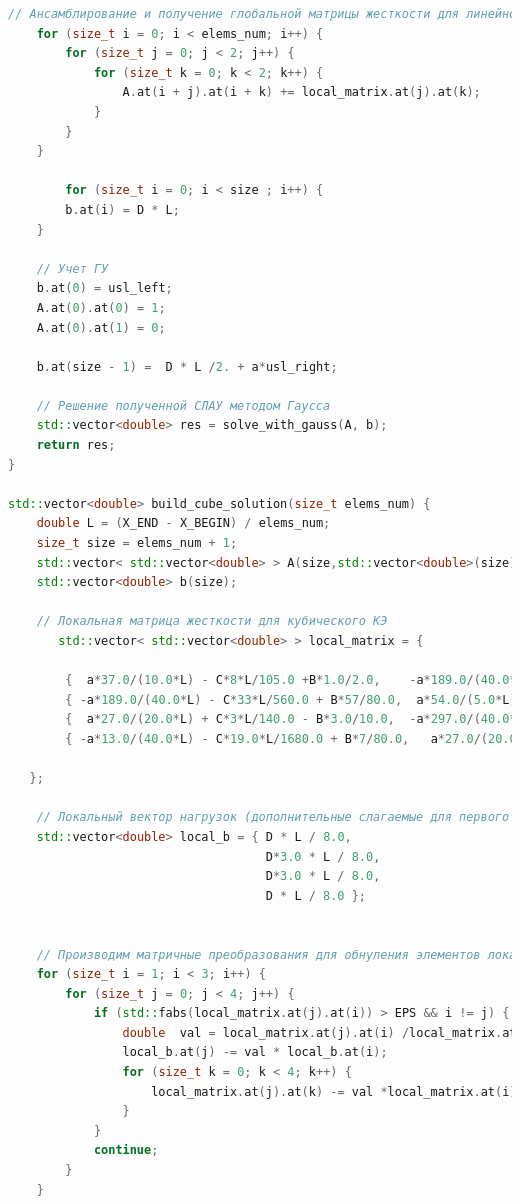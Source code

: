 \begin{lstlisting}[language=c++, label=prog,caption={\textit{Реализация МКЭ}}]
    // Ансамблирование и получение глобальной матрицы жесткости для линейного КЭ
    for (size_t i = 0; i < elems_num; i++) {
        for (size_t j = 0; j < 2; j++) {
            for (size_t k = 0; k < 2; k++) {
                A.at(i + j).at(i + k) += local_matrix.at(j).at(k);
            }
        }
    }
    
        for (size_t i = 0; i < size ; i++) {
        b.at(i) = D * L;
    }
    
    // Учет ГУ 
    b.at(0) = usl_left;
    A.at(0).at(0) = 1;
    A.at(0).at(1) = 0;
    
    b.at(size - 1) =  D * L /2. + a*usl_right;
    
    // Решение полученной СЛАУ методом Гаусса
    std::vector<double> res = solve_with_gauss(A, b);
    return res;
}

std::vector<double> build_cube_solution(size_t elems_num) {
    double L = (X_END - X_BEGIN) / elems_num;
    size_t size = elems_num + 1;
    std::vector< std::vector<double> > A(size,std::vector<double>(size));
    std::vector<double> b(size);
    
    // Локальная матрица жесткости для кубического КЭ
       std::vector< std::vector<double> > local_matrix = {

        {  a*37.0/(10.0*L) - C*8*L/105.0 +B*1.0/2.0,    -a*189.0/(40.0*L) - C*33*L/560.0 - B*57/80.0, a*27.0/(20.0*L) + C*3*L/140.0 + B*3.0/10.0, -a*13.0/(40.0*L) -  C*19.0*L/1680.0 - B*7/80.0},
        { -a*189.0/(40.0*L) - C*33*L/560.0 + B*57/80.0,  a*54.0/(5.0*L)-C*27*L/70.0,                  -a*297.0/(40*L) + C*27*L/560.0 - B*81.0/80.0,    a*27.0/(20.0*L) +  C*3*L/140.0 + B*3.0/10.0},
        {  a*27.0/(20.0*L) + C*3*L/140.0 - B*3.0/10.0,  -a*297.0/(40.0*L) + C*27*L/560.0 + B*81.0/80.0,  a*54.0/(5.0*L) - C*27*L/70.0,                -a*189.0/(40.0*L) - C*33*L/560.0 - B*57/80.0},
        { -a*13.0/(40.0*L) - C*19.0*L/1680.0 + B*7/80.0,   a*27.0/(20.0*L) + C*3*L/140.0 - B*3.0/10.0 , -a*189.0/(40.0*L) - C*33*L/560.0 + B*57/80.0,      a*37.0/(10.0*L) - C*8*L/105.0 - B*1.0/2.0}
        
   };
    
    // Локальный вектор нагрузок (дополнительные слагаемые для первого и последнего элементов учитываются далее)
    std::vector<double> local_b = { D * L / 8.0,
                                    D*3.0 * L / 8.0,
                                    D*3.0 * L / 8.0, 
                                    D * L / 8.0 };

    
    // Производим матричные преобразования для обнуления элементов локальной матрицы жесткости, относящихся к внутренним узлам
    for (size_t i = 1; i < 3; i++) {
        for (size_t j = 0; j < 4; j++) {
            if (std::fabs(local_matrix.at(j).at(i)) > EPS && i != j) {
                double  val = local_matrix.at(j).at(i) /local_matrix.at(i).at(i);
                local_b.at(j) -= val * local_b.at(i);
                for (size_t k = 0; k < 4; k++) {
                    local_matrix.at(j).at(k) -= val *local_matrix.at(i).at(k);
                }
            }
            continue;
        }
    }
    

\end{lstlisting}
